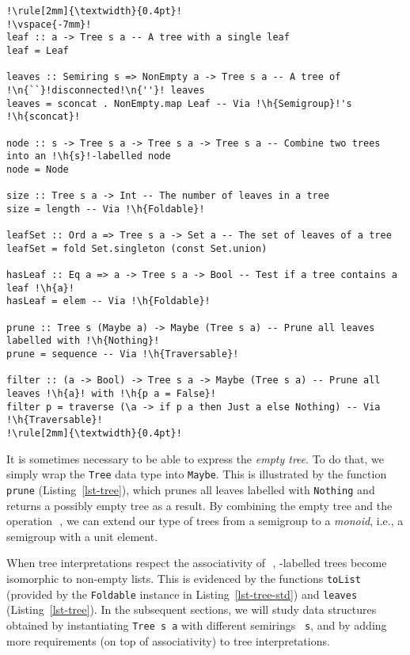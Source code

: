 \documentclass[english,submission]{programming}
\newcommand{\code}[1]{\lstinline[mathescape]|#1|}
\newcommand{\hcode}[1]{{\color{darkblue} \lstinline[keywordstyle={}]|#1|}} %
\newcommand{\h}[1]{{\itshape\color{grayblue}#1}} %
\newcommand{\n}[1]{{\itshape\color{graygreen}#1}} %
\newcommand{\zero}{\raisebox{-0.2mm}{\textcircled{\textsf{0}}}\xspace}
\newcommand{\dia}{\,\text{\raisebox{-0.3mm}{\Large $\diamond$}}\,}
\begin{document}
\begin{lstlisting}[float,label=lst-tree,xleftmargin=0pt,belowskip=-2mm,caption={
    A basic API for constructing and manipulating trees. We use the standard
    module \code{Data.L}\code{ist.N}\code{onEmpty} for representing non-empty
    lists, and \code{Data.S}\code{et} for sets.}]
!\rule[2mm]{\textwidth}{0.4pt}!
!\vspace{-7mm}!
leaf :: a -> Tree s a -- A tree with a single leaf
leaf = Leaf

leaves :: Semiring s => NonEmpty a -> Tree s a -- A tree of !\n{``}!disconnected!\n{''}! leaves
leaves = sconcat . NonEmpty.map Leaf -- Via !\h{Semigroup}!'s !\h{sconcat}!

node :: s -> Tree s a -> Tree s a -> Tree s a -- Combine two trees into an !\h{s}!-labelled node
node = Node

size :: Tree s a -> Int -- The number of leaves in a tree
size = length -- Via !\h{Foldable}!

leafSet :: Ord a => Tree s a -> Set a -- The set of leaves of a tree
leafSet = fold Set.singleton (const Set.union)

hasLeaf :: Eq a => a -> Tree s a -> Bool -- Test if a tree contains a leaf !\h{a}!
hasLeaf = elem -- Via !\h{Foldable}!

prune :: Tree s (Maybe a) -> Maybe (Tree s a) -- Prune all leaves labelled with !\h{Nothing}!
prune = sequence -- Via !\h{Traversable}!

filter :: (a -> Bool) -> Tree s a -> Maybe (Tree s a) -- Prune all leaves !\h{a}! with !\h{p a = False}!
filter p = traverse (\a -> if p a then Just a else Nothing) -- Via !\h{Traversable}!
!\rule[2mm]{\textwidth}{0.4pt}!
\end{lstlisting}

\noindent
It is sometimes necessary to be able to express the \emph{empty tree}. To do
that, we simply wrap the \hcode{Tree} data type into \hcode{Maybe}. This is
illustrated by the function \hcode{prune} (Listing~\ref{lst-tree}), which prunes
all leaves labelled with \hcode{Nothing} and returns a possibly empty tree as a
result. By combining the empty tree and the operation \dia, we can extend our
type of trees from a semigroup to a \emph{monoid}, i.e., a semigroup with a unit
element.

When tree interpretations respect the associativity of \dia, \zero-labelled
trees become isomorphic to non-empty lists. This is evidenced by the functions
\hcode{toList} (provided by the \hcode{Foldable} instance in
Listing~\ref{lst-tree-std}) and \hcode{leaves} (Listing~\ref{lst-tree}). In the
subsequent sections, we will study data structures obtained by instantiating
\hcode{Tree s a} with different semirings~\hcode{s}, and by adding more
requirements (on top of associativity) to tree interpretations.
\end{document}
